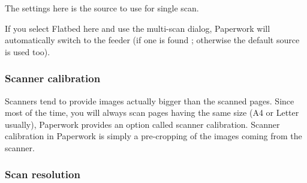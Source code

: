 \documentclass[10pt,a4paper]{article}
\begin{document}
The settings here is the source to use for single scan.

If you select Flatbed here and use the
multi-scan dialog, Paperwork will
automatically switch to the feeder (if one is found ; otherwise the
default source is used too).



\subsubsection{Scanner calibration}

Scanners tend to provide images actually bigger than the scanned pages.
Since most of the time, you will always scan pages having the same
size (A4 or Letter usually), Paperwork provides an option called scanner
calibration. Scanner calibration in Paperwork is simply
a pre-cropping of the images coming from the scanner.



\subsubsection{Scan resolution}
\end{document}

